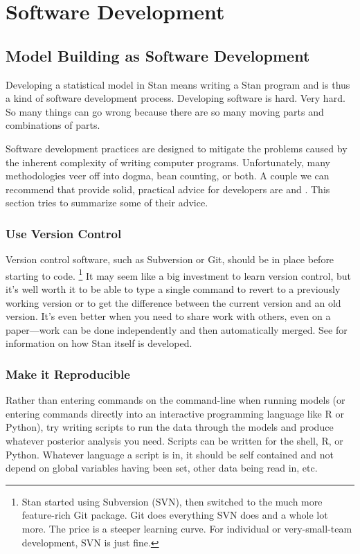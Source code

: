 \part{Software Development}


\chapter{Model Building as Software Development}

\noindent
Developing a statistical model in Stan means writing a Stan program
and is thus a kind of software development process.  Developing
software is hard.  Very hard.  So many things can go wrong because
there are so many moving parts and combinations of parts.

Software development practices are designed to mitigate the problems
caused by the inherent complexity of writing computer programs.
Unfortunately, many methodologies veer off into dogma, bean counting,
or both.  A couple we can recommend that provide solid, practical
advice for developers are \citep{HuntThomas:99} and
\citep{McConnell:2004}.  This section tries to summarize some of their
advice.

\section{Use Version Control}

Version control software, such as Subversion or Git, should be in
place before starting to code.%
%
\footnote{Stan started using Subversion (SVN), then switched to the
  much more feature-rich Git package.  Git does everything SVN does
  and a whole lot more.  The price is a steeper learning curve.  For
  individual or very-small-team development, SVN is just fine.}
%
It may seem like a big investment to learn version control, but it's
well worth it to be able to type a single command to revert to a
previously working version or to get the difference between the
current version and an old version.  It's even better when you need
to share work with others, even on a paper---work can be done
independently and then automatically merged.  See
 for information on how Stan itself
is developed.


\section{Make it Reproducible}

Rather than entering commands on the command-line when running models
(or entering commands directly into an interactive programming
language like R or Python), try writing scripts to run the data
through the models and produce whatever posterior analysis you need.
Scripts can be written for the shell, R, or Python.  Whatever language
a script is in, it should be self contained and not depend on global
variables having been set, other data being read in, etc.

